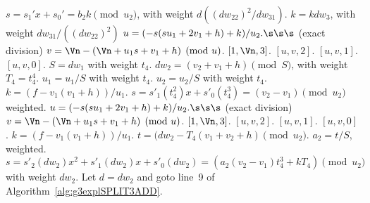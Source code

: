 \begin{algorithm}
\begin{algorithmic} [1]
                    \State $s = s_1'x + s_0' = b_2k \pmod{u_2}$, with weight $d((dw_{22})^2/dw_{31})$.
                    \State $k = kdw_3$, with weight $dw_{31}/((dw_{22})^2)$
                    \State $u = (-s(su_1 + 2v_1 + h) + k)/u_2. \s\s\s$ (exact division)
                    \State $v = \Vn - (\Vn +u_1s + v_1 + h) \pmod{u}$.
                             \hspace{2pt} \Return $[1,\Vn,3]$.
                            \Else \hspace{2pt} \Return $[u,v,2]$.
                            \EndIf
                        \Else \hspace{2pt} \Return $[u,v,1]$.
                        \EndIf
                    \Else \hspace{2pt} \Return $[u,v,0]$.
                    \EndIf
                \EndIf
            \EndIf
        \Else
            \State $S =dw_1$ with weight $t_4$.
            \State $dw_2 = (v_2 + v_1 + h) \pmod{S}$, with weight $T_4 = t_4^4$.
                \State $u_1 = u_1/S$ with weight $t_4$.
                \State $u_2 = u_2/S$ with weight $t_4$.
                \State $k = (f - v_1(v_1 + h))/u_1$.
                \State $s = s'_1(t_4^2)x + s'_0(t_4^3) = (v_2 - v_1) \pmod{u_2}$ weighted.
                \State $u = (-s(su_1 + 2v_1 + h) + k)/u_2. \s\s\s$ (exact division)
                \State $v = \Vn - (\Vn +u_1s + v_1 + h) \pmod{u}$.
                         \hspace{2pt} \Return $[1,\Vn,3]$.
                        \Else \hspace{2pt} \Return $[u,v,2]$.
                        \EndIf
                    \Else \hspace{2pt} \Return $[u,v,1]$.
                    \EndIf
                \Else \hspace{2pt} \Return $[u,v,0]$.
                \EndIf
            \Else
                \State $k = (f - v_1(v_1 + h))/u_1$.
                \State $t = (dw_2 - T_4(v_1 + v_2 + h) \pmod{u_2}$.
                \State $a_2 = t/S$, weighted.
                \State $s = s'_2(dw_2)x^2 + s'_1(dw_2)x + s'_0(dw_2) = (a_2(v_2 - v_1)t_4^3 + kT_4) \pmod{u_2}$ with weight $dw_2$.
                \State Let $d = dw_2$ and goto line~9 of Algorithm~\ref{alg:g3explSPLIT3ADD}.
            \EndIf
        \EndIf
    \Else %
    \EndIf
    \end{algorithmic}
    \end{algorithm}